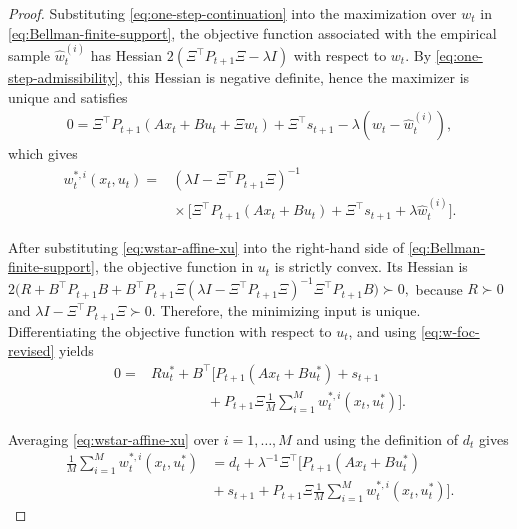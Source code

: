 \documentclass[10pt,journal,twoside]{IEEEtran}
\theoremstyle{definition}
\theoremstyle{remark}
\begin{document}
\begin{proof}
	Substituting \eqref{eq:one-step-continuation} into the maximization over \(w_t\) in \eqref{eq:Bellman-finite-support}, the objective function associated with the empirical sample \(\widehat w_t^{(i)}\) has Hessian
	\(
	2(\Xi^\top P_{t+1}\Xi-\lambda I)
	\)
	with respect to \(w_t\). By \eqref{eq:one-step-admissibility}, this Hessian is negative definite, hence the maximizer is unique and
    satisfies
	\begin{equation}
		\begin{aligned}
			0\!=\!
			\Xi^\top\! P_{t+1}(Ax_t\!+\!\!Bu_t\!+\!\Xi w_t)
			+\Xi^\top \!s_{t+1} \!-\!\lambda(w_t\!-\!\widehat w_t^{(i)}),
		\end{aligned}
		\label{eq:w-foc-revised}
	\end{equation}
	which gives
	\begin{equation}
		\begin{aligned}
			w_t^{*,i}(x_t,u_t)
			={}&
			(\lambda I-\Xi^\top P_{t+1}\Xi)^{-1}        \\
			&\!\!\!\!\!\!\!\!\!\!\!\!\!\!\!\!\!\!\!\times
			\Big[
			\Xi^\top P_{t+1}(Ax_t+Bu_t)
			+\Xi^\top s_{t+1}
			+\lambda\widehat w_t^{(i)}
			\Big].
		\end{aligned}
		\label{eq:wstar-affine-xu}
	\end{equation}
	
	After substituting \eqref{eq:wstar-affine-xu} into the right-hand side of \eqref{eq:Bellman-finite-support}, the objective function in \(u_t\) is strictly convex. Its Hessian is
	\(
	2\Big(
	R+B^\top P_{t+1}B
	+B^\top P_{t+1}\Xi
	(\lambda I-\Xi^\top P_{t+1}\Xi)^{-1}
	\Xi^\top P_{t+1}B
	\Big)\succ0,
	\)
	because \(R\succ0\) and \(\lambda I-\Xi^\top P_{t+1}\Xi\succ0\). Therefore, the minimizing input is unique. Differentiating the objective function with respect to \(u_t\), and using \eqref{eq:w-foc-revised} yields 
	\begin{equation}
		\begin{aligned}
			0={}&
			Ru_t^*
			+B^\top
			\Bigg[
			P_{t+1}(Ax_t+Bu_t^*)
			+s_{t+1}  \\
			&\qquad\qquad
			+P_{t+1}\Xi
			\frac1M\sum_{i=1}^M
			w_t^{*,i}(x_t,u_t^*)
			\Bigg].
		\end{aligned}
		\label{eq:u-foc-revised}
	\end{equation}
	
	Averaging \eqref{eq:wstar-affine-xu} over \(i=1,\ldots,M\) and using the definition of \(d_t\) gives
	\begin{equation}
		\begin{aligned}
			\frac1M\sum_{i=1}^M
			w_t^{*,i}(x_t,u_t^*)  
			& =
			d_t
			+\lambda^{-1}\Xi^\top
			\Bigg[
			P_{t+1}(Ax_t+Bu_t^*)  \\
			&\!\!\!\!\!\!\!\!\!+s_{t+1}
			+P_{t+1}\Xi
			\frac1M\sum_{i=1}^M
			w_t^{*,i}(x_t,u_t^*)
			\Bigg].
		\end{aligned}
		\label{eq:wavg-revised}
	\end{equation}
	

\end{proof}
\end{document}

